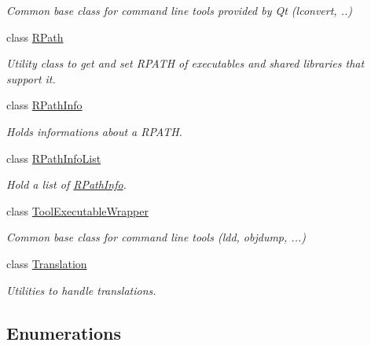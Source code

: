 \begin{DoxyCompactItemize}
\begin{DoxyCompactList}\small\item\em Common base class for command line tools provided by Qt (lconvert, ..) \end{DoxyCompactList}\item 
class \hyperlink{class_mdt_1_1_deploy_utils_1_1_r_path}{R\+Path}
\begin{DoxyCompactList}\small\item\em Utility class to get and set R\+P\+A\+TH of executables and shared libraries that support it. \end{DoxyCompactList}\item 
class \hyperlink{class_mdt_1_1_deploy_utils_1_1_r_path_info}{R\+Path\+Info}
\begin{DoxyCompactList}\small\item\em Holds informations about a R\+P\+A\+TH. \end{DoxyCompactList}\item 
class \hyperlink{class_mdt_1_1_deploy_utils_1_1_r_path_info_list}{R\+Path\+Info\+List}
\begin{DoxyCompactList}\small\item\em Hold a list of \hyperlink{class_mdt_1_1_deploy_utils_1_1_r_path_info}{R\+Path\+Info}. \end{DoxyCompactList}\item 
class \hyperlink{class_mdt_1_1_deploy_utils_1_1_tool_executable_wrapper}{Tool\+Executable\+Wrapper}
\begin{DoxyCompactList}\small\item\em Common base class for command line tools (ldd, objdump, ...) \end{DoxyCompactList}\item 
class \hyperlink{class_mdt_1_1_deploy_utils_1_1_translation}{Translation}
\begin{DoxyCompactList}\small\item\em Utilities to handle translations. \end{DoxyCompactList}\end{DoxyCompactItemize}
\subsection*{Enumerations}
